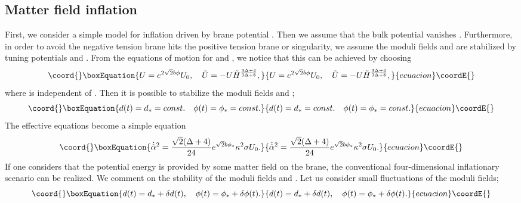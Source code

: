 \documentclass[a4paper,11pt]{article}
\begin{document}
\subsection{Matter field inflation}
First, we consider a simple model for inflation 
driven by brane potential \coordHE{}. Then we assume that
the bulk potential vanishes \coordHE{}. Furthermore, in order to
avoid the negative tension brane hits the positive tension
brane or singularity, we assume the moduli fields \coordHE{} and 
\coordHE{} are stabilized by tuning potentials \coordHE{} and \coordHE{}. 
From the equations of motion for \coordHE{} and \coordHE{}, 
we notice that this can be achieved by choosing 
\begin{equation}\coord{}\boxEquation{
U=e^{2 \sqrt{2} b \phi} U_0, \quad 
\tilde{U}=-U \tilde{H}^{\frac{3 \Delta+4}{3 \Delta+8}},
}{
U=e^{2 \sqrt{2} b \phi} U_0, \quad 
\tilde{U}=-U \tilde{H}^{\frac{3 \Delta+4}{3 \Delta+8}},
}{ecuacion}\coordE{}\end{equation}
where \coordHE{} is independent of \myHighlight{$\phi$}\coordHE{}. Then 
it is possible to stabilize the moduli fields \coordHE{} and \coordHE{};
\begin{equation}\coord{}\boxEquation{
d(t)=d_{\ast}=const. \quad \phi(t)=\phi_{\ast}=const.
}{
d(t)=d_{\ast}=const. \quad \phi(t)=\phi_{\ast}=const.
}{ecuacion}\coordE{}\end{equation}
The effective equations become a simple equation
\begin{equation}\coord{}\boxEquation{
\dot{\hat{\alpha}}^2= \frac{\sqrt{2} (\Delta+4)}{24}e^{\sqrt{2} b \phi_{\ast}}
 \kappa^2 \sigma U_0.
}{
\dot{\hat{\alpha}}^2= \frac{\sqrt{2} (\Delta+4)}{24}e^{\sqrt{2} b \phi_{\ast}}
 \kappa^2 \sigma U_0.
}{ecuacion}\coordE{}\end{equation}
If one considers that the potential energy \coordHE{} is provided by some
matter field on the brane, the conventional four-dimensional inflationary 
scenario can be realized. We comment on the stability of the moduli 
fields \coordHE{} and \coordHE{}. Let us consider small fluctuations of the 
moduli fields;
\begin{equation}\coord{}\boxEquation{
d(t)=d_{\ast}+\delta d(t),\quad \phi(t)=\phi_{\ast}+\delta \phi(t).
}{
d(t)=d_{\ast}+\delta d(t),\quad \phi(t)=\phi_{\ast}+\delta \phi(t).
}{ecuacion}\coordE{}\end{equation}
\end{document}

